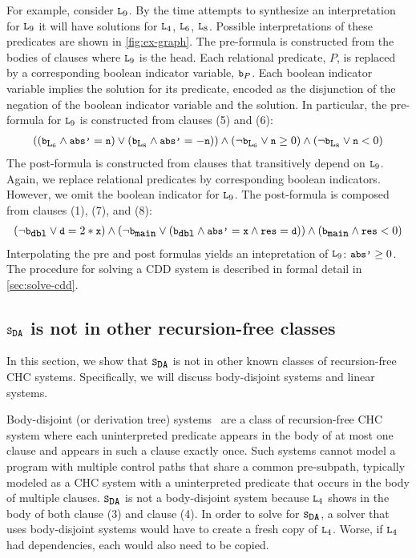 For example, consider $\cc{L}_9$. By the time \sys attempts to
synthesize an interpretation for $\cc{L}_9$ it will have solutions for
$\cc{L}_4$, $\cc{L}_6$, $\cc{L}_8$.
%
Possible interpretations of these predicates are shown in
\autoref{fig:ex-graph}.
%
The pre-formula is constructed from the bodies of clauses where
$\cc{L}_9$ is the head.
%
Each relational predicate, $P$,
is replaced by a corresponding boolean indicator variable, $\cc{b}_P$.
%
Each boolean indicator variable implies the solution for its
predicate,
encoded as the disjunction of the negation of the boolean
indicator variable and the solution.
%
In particular, the pre-formula for $\cc{L}_9$ is constructed from
clauses (5) and (6):
\begin{gather}
  ((\cc{b}_{\cc{L}_6} \land \cc{abs'} = \cc{n})
  \lor
  (\cc{b}_{\cc{L}_8} \land \cc{abs'} = -\cc{n}))
  \land
  (\neg \cc{b}_{\cc{L}_6} \lor \cc{n} \ge 0)
  \land
  (\neg \cc{b}_{\cc{L}_8} \lor \cc{n} < 0)
\end{gather}
%
The post-formula is constructed from clauses that transitively depend
on $\cc{L}_9$. Again, we replace relational predicates by
corresponding boolean indicators. However, we omit the boolean indicator for
$\cc{L}_9$. The post-formula is composed from clauses (1), (7), and
(8):
\begin{gather}
  (\neg \cc{b}_{\cc{dbl}} \lor \cc{d} = 2*\cc{x})
  \land
  (\neg \cc{b}_{\cc{main}} \lor
    (\cc{b}_{\cc{dbl}}
    \land \cc{abs'}= \cc{x}
    \land \cc{res}=\cc{d} ))
  \land
  (\cc{b}_{\cc{main}} \land \cc{res} < 0)
\end{gather}
%
Interpolating the pre and post formulas yields an intepretation
of $\cc{L}_9$: $\cc{abs'} \geq 0$.
%
The procedure for solving a CDD system is described in formal detail
in \autoref{sec:solve-cdd}.

\subsection{$\mcchc$ is not in other recursion-free classes}
\label{sec:not-in}
%
In this section, we show that $\mcchc$ is not in other
known classes of recursion-free CHC systems. 
%
Specifically, we will
discuss body-disjoint systems and linear systems.
%

Body-disjoint (or derivation tree)
systems~\cite{mcmillan14,bjorner13,heizmann10,rummer13a,rummer13b} are
a class of recursion-free CHC system where each uninterpreted
predicate appears in the body of at most one clause and appears in
such a clause exactly once.
%
Such systems cannot model a program with multiple control paths that
share a common pre-subpath, typically modeled as a CHC system with a
uninterpreted predicate that occurs in the body of multiple clauses.
%
$\mcchc$ is not a body-disjoint system because $\cc{L}_4$ shows in the
body of both clause (3) and clause (4).
%
In order to solve for $\mcchc$, a solver that uses
body-disjoint systems would have to create a fresh copy of
$\cc{L}_4$. 
%
Worse, if $\cc{L}_4$ had dependencies, each would also need to be copied.

